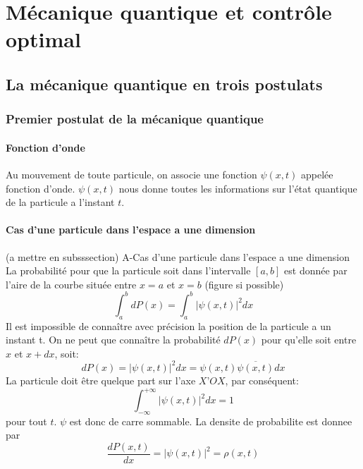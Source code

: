 \chapter{Mécanique quantique et contrôle optimal}

\section{La mécanique quantique en trois postulats}
\subsection{Premier postulat de la mécanique quantique}
\subsubsection{Fonction d'onde}
Au mouvement de toute particule, on associe une fonction $\psi(x,t)$ appelée fonction d’onde. $\psi(x,t)$ nous donne toutes les informations sur l'état quantique de la particule a l’instant $t$.\\
\subsubsection{Cas d’une particule dans l’espace a une dimension}
(a mettre en subsssection)
A-Cas d’une particule dans l’espace a une dimension\\
La probabilité pour que la particule soit dans l’intervalle $[a,b]$ est donnée par l’aire de la courbe située entre $x=a$ et $x=b$ (figure si possible)
\begin{equation}
\int_a^b dP(x)= \int_a^b |\psi(x,t)|^2dx
\end{equation}
Il est impossible de connaître avec précision la position de la particule a un instant t. On ne peut que connaître la probabilité $dP(x)$ pour qu’elle soit entre $x$ et $x+dx$, soit:
\begin{equation}
dP(x)=|\psi(x,t)|^2dx=\psi(x,t)\overline{\psi(x,t)}dx
\end{equation}
La particule doit être quelque part sur l’axe $X’OX$, par conséquent:
\begin{equation}
\int_{-\infty}^{+\infty}|\psi(x,t)|^2dx=1
\end{equation}
pour tout $t$. $\psi$ est donc de carre sommable.
La densite de probabilite est donnee par
\begin{equation}
\frac{dP(x,t)}{dx}=|\psi(x,t)|^2=\rho(x,t)
\end{equation}

